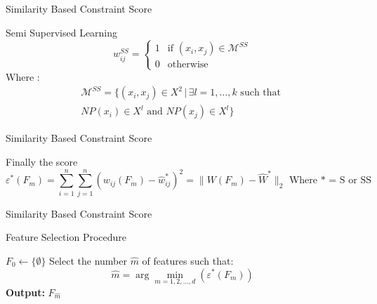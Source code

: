 \documentclass{beamer}
\begin{document}
\begin{frame}{Similarity Based Constraint Score}
    \begin{block}{Semi Supervised Learning}
        \[
            w_{ij}^{SS} =
            \begin{cases}
              1 & \text{if } (x_i, x_j) \in \mathcal{M}^{SS} \\
              0 & \text{otherwise}
            \end{cases}
        \]
    Where :
    \[
    \begin{split}
        \mathcal{M}^{SS} = \{(x_i, x_j) \in X^2 \,|\, \exists l = 1, \ldots, k \text{ such that }\\
        NP(x_i) \in X^l \text{ and } NP(x_j) \in X^l\}
    \end{split}
    \]
    \end{block}
\end{frame}

\begin{frame}{Similarity Based Constraint Score}
    \begin{block}{Finally the score}
\[
\varepsilon^*(F_m) = \sum_{i=1}^n \sum_{j=1}^n (w_{ij}(F_m) - \hat{w}^*_{ij})^2
 = \lVert W(F_m) - \hat{W}^* \rVert_2
\text{  Where * =  S or SS} \]
    \end{block}
\end{frame}

\begin{frame}{Similarity Based Constraint Score}
    \begin{algorithm}[H]
        \caption{Feature Selection Procedure}
        \setlength{\algomargin}{1em} %
        \small\DontPrintSemicolon
        $F_0 \leftarrow \{\emptyset\}$\;
        Select the number $\hat{m}$ of features such that:
        \[
            \hat{m} = \arg \min_{m=1,2,\ldots,d} (\varepsilon^{*}(F_m))
        \]\;
        \textbf{Output:} $F_{\hat{m}}$\;
    \end{algorithm}
\end{frame}
\end{document}
